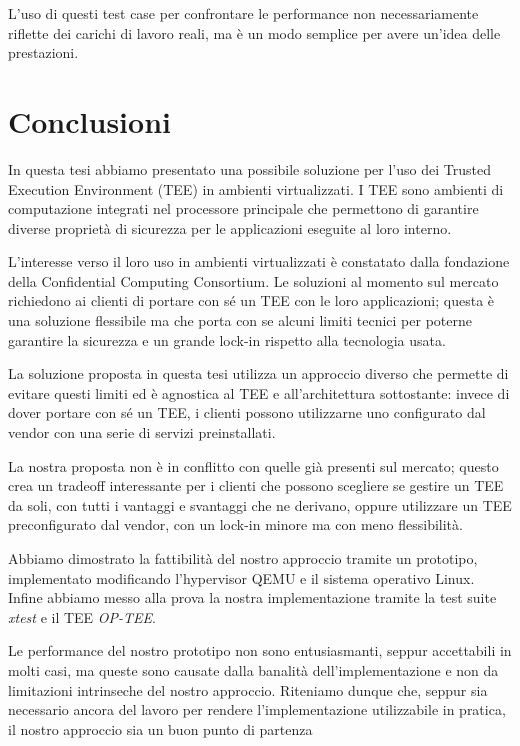\documentclass[12pt,italian]{report}
\begin{document}
L'uso di questi test case per confrontare le performance non necessariamente
riflette dei carichi di lavoro reali, ma è un modo semplice per avere
un'idea delle prestazioni.

\chapter{Conclusioni}
\label{chap:conclusioni}
In questa tesi abbiamo presentato una possibile soluzione per l'uso dei
Trusted Execution Environment (TEE) in ambienti virtualizzati.
I TEE sono ambienti di computazione integrati nel processore principale
che permettono di garantire diverse proprietà di sicurezza per le
applicazioni eseguite al loro interno.

L'interesse verso il loro uso in ambienti virtualizzati è constatato dalla
fondazione della Confidential Computing Consortium.
Le soluzioni al momento sul mercato richiedono ai clienti di portare con sé
un TEE con le loro applicazioni; questa è una soluzione flessibile ma che
porta con se alcuni limiti tecnici per poterne garantire la sicurezza
e un grande lock-in rispetto alla tecnologia usata.

La soluzione proposta in questa tesi utilizza un approccio diverso che
permette di evitare questi limiti ed è agnostica al TEE e all'architettura
sottostante:
invece di dover portare con sé un TEE, i clienti possono utilizzarne uno
configurato dal vendor con una serie di servizi preinstallati.

La nostra proposta non è in conflitto con quelle già presenti sul mercato;
questo crea un tradeoff interessante per i clienti che possono scegliere
se gestire un TEE da soli, con tutti i vantaggi e svantaggi che ne derivano,
oppure utilizzare un TEE preconfigurato dal vendor, con un lock-in minore
ma con meno flessibilità.

Abbiamo dimostrato la fattibilità del nostro approccio tramite un prototipo,
implementato modificando l'hypervisor QEMU e il sistema operativo Linux.
Infine abbiamo messo alla prova la nostra implementazione tramite la test
suite \textit{xtest} e il TEE \textit{OP-TEE}.

Le performance del nostro prototipo non sono entusiasmanti, seppur accettabili
in molti casi, ma queste sono causate dalla banalità dell'implementazione e
non da limitazioni intrinseche del nostro approccio.
Riteniamo dunque che, seppur sia necessario ancora del lavoro per rendere
l'implementazione utilizzabile in pratica, il nostro approccio sia un buon
punto di partenza
\end{document}
